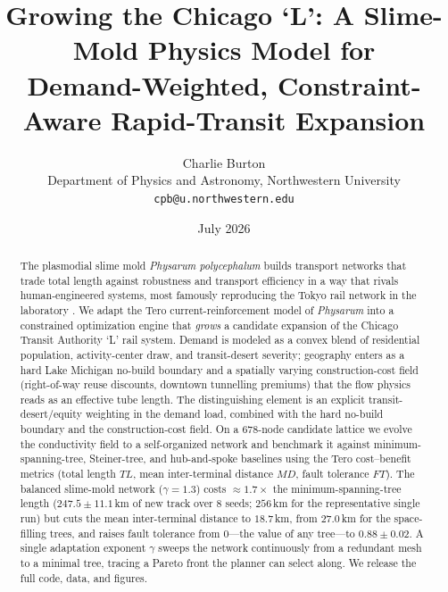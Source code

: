 \documentclass[11pt]{article}
\title{\bfseries Growing the Chicago `L': A Slime-Mold Physics Model for \\
Demand-Weighted, Constraint-Aware Rapid-Transit Expansion}
\author{Charlie Burton\\
  \small Department of Physics and Astronomy, Northwestern University \\
  \small \texttt{cpb@u.northwestern.edu}}
\date{July 2026}
\begin{document}
\maketitle

\begin{abstract}
\noindent The plasmodial slime mold \emph{Physarum polycephalum} builds transport
networks that trade total length against robustness and transport efficiency in a
way that rivals human-engineered systems, most famously reproducing the Tokyo rail
network in the laboratory \citep{tero2010}. We adapt the Tero current-reinforcement
model of \emph{Physarum} into a constrained optimization engine that \emph{grows} a
candidate expansion of the Chicago Transit Authority `L' rail system. Demand is
modeled as a convex blend of residential population, activity-center draw, and
transit-desert severity; geography enters as a hard Lake Michigan no-build boundary
and a spatially varying construction-cost field (right-of-way reuse discounts,
downtown tunnelling premiums) that the flow physics reads as an effective tube
length.
The distinguishing element is an explicit transit-desert/equity weighting in the demand
load, combined with the hard no-build boundary and the construction-cost field. On a
$678$-node candidate lattice we evolve the conductivity field to a
self-organized network and benchmark it against minimum-spanning-tree, Steiner-tree,
and hub-and-spoke baselines using the Tero cost--benefit metrics (total length $TL$,
mean inter-terminal distance $MD$, fault tolerance $FT$).
The balanced slime-mold
network ($\gamma=1.3$) costs $\approx\!1.7\times$ the minimum-spanning-tree length ($247.5\pm11.1$\,km
of new track over 8 seeds; $256$\,km for the representative single run) but cuts the mean
inter-terminal distance to $18.7$\,km, from $27.0$\,km for the space-filling trees, and raises
fault tolerance from $0$---the value of any tree---to $0.88\pm0.02$. A single
adaptation exponent $\gamma$ sweeps the network continuously from a redundant mesh
to a minimal tree, tracing a Pareto front the planner can select along. We release
the full code, data, and figures.
\end{abstract}
\end{document}
